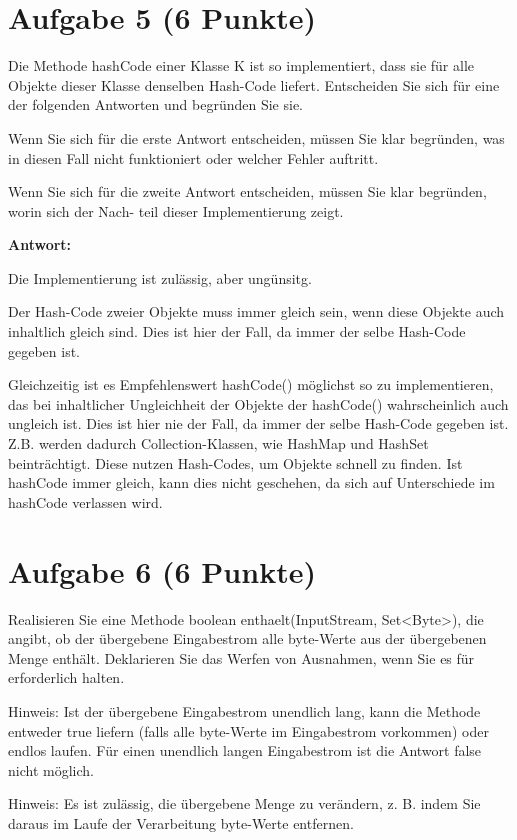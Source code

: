 \section{Aufgabe 5 (6 Punkte)}

Die Methode hashCode einer Klasse K ist so implementiert, dass sie für alle
Objekte dieser Klasse denselben Hash-Code liefert. Entscheiden Sie sich für
eine der folgenden Antworten und begründen Sie sie.

Wenn Sie sich für die erste Antwort entscheiden, müssen Sie klar begründen, was
in diesen Fall nicht funktioniert oder welcher Fehler auftritt.

Wenn Sie sich für die zweite Antwort entscheiden, müssen Sie klar begründen,
worin sich der Nach- teil dieser Implementierung zeigt.

\textbf{Antwort:}

Die Implementierung ist zulässig, aber ungünsitg.

Der Hash-Code zweier Objekte muss immer gleich sein, wenn diese Objekte auch
inhaltlich gleich sind. Dies ist hier der Fall, da immer der selbe Hash-Code
gegeben ist.

Gleichzeitig ist es Empfehlenswert hashCode() möglichst so zu implementieren,
das bei inhaltlicher Ungleichheit der Objekte der hashCode() wahrscheinlich
auch ungleich ist. Dies ist hier nie der Fall, da immer der selbe Hash-Code
gegeben ist. Z.B. werden dadurch Collection-Klassen, wie HashMap und HashSet
beinträchtigt. Diese nutzen Hash-Codes, um Objekte schnell zu finden. Ist
hashCode immer gleich, kann dies nicht geschehen, da sich auf Unterschiede im
hashCode verlassen wird.

\section{Aufgabe 6 (6 Punkte)}

Realisieren Sie eine Methode boolean enthaelt(InputStream, Set<Byte>), die
angibt, ob der übergebene Eingabestrom alle byte-Werte aus der übergebenen
Menge enthält. Deklarieren Sie das Werfen von Ausnahmen, wenn Sie es für
erforderlich halten.

Hinweis: Ist der übergebene Eingabestrom unendlich lang, kann die Methode
entweder true liefern (falls alle byte-Werte im Eingabestrom vorkommen) oder
endlos laufen. Für einen unendlich langen Eingabestrom ist die Antwort false
nicht möglich.

Hinweis: Es ist zulässig, die übergebene Menge zu verändern, z. B. indem Sie
daraus im Laufe der Verarbeitung byte-Werte entfernen.

